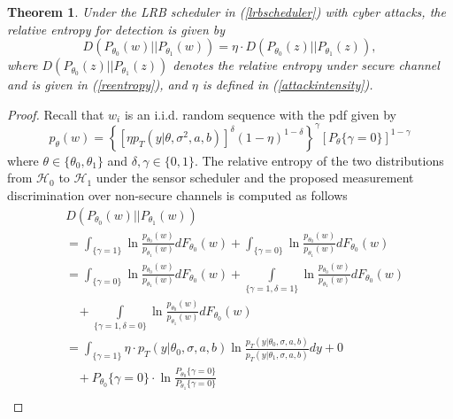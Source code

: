 \documentclass[journal]{IEEEtran}
\def\cH{\mathcal{H}}
\newtheorem{thm}{Theorem}
\begin{document}
\begin{thm}\label{thm_attack}
Under the LRB scheduler in (\ref{lrbscheduler}) with  cyber attacks, the relative entropy for detection is given by
\begin{equation}
D(P_{\theta_0}({w})||P_{\theta_1}({w}))=\eta \cdot D(P_{\theta_0}({z})||P_{\theta_1}({z})),
\end{equation}
where $D(P_{\theta_0}({z})||P_{\theta_1}({z}))$ denotes the relative entropy under secure channel and is given in (\ref{reentropy}), and $\eta$ is defined in (\ref{attackintensity}).
\end{thm}
\begin{proof}
Recall that $w_{i}$ is an i.i.d. random sequence with the pdf given by
\begin{equation*}
p_\theta(w) = {\left\{ {{{\left[ {\eta {p_T}(y|\theta ,{\sigma ^2},a,b)} \right]}^\delta }{{(1 - \eta )}^{1 - \delta }}} \right\}^\gamma }{\left[ {{P_\theta }\{ \gamma  = 0\} } \right]^{1 - \gamma }}
\end{equation*}
where $ \theta\in\{\theta_0, \theta_1\}$ and $\delta, \gamma\in\{0, 1\}$.
The relative entropy of the two distributions  from $\cH_0$ to $\cH_1$ under the sensor scheduler and  the proposed measurement discrimination over non-secure channels is computed as follows
\begin{equation*}
\begin{split}
&D(P_{\theta_0}({w})||P_{\theta_1}({w}))\\
&=\int_{\{ \gamma  = 1\} } {\ln \frac{{{p_{{\theta _0}}}(w)}}{{{p_{{\theta _1}}}(w)}}d{F_{{\theta _0}}}(w)}  + \int_{\{ \gamma  = 0\} } {\ln \frac{{{p_{{\theta _0}}}(w)}}{{{p_{{\theta _1}}}(w)}}d{F_{{\theta _0}}}(w)} \\
&=  \int_{\{ \gamma  = 0\} } {\ln \frac{{{p_{{\theta _0}}}(w)}}{{{p_{{\theta _1}}}(w)}}d{F_{{\theta _0}}}(w)} +
\int\limits_{\{ \gamma  = 1,\delta  = 1\} } {\ln \frac{{{p_{{\theta _0}}}(w)}}{{{p_{{\theta _1}}}(w)}}d{F_{{\theta _0}}}(w)}  \\
&~~~~+\int\limits_{\{ \gamma  = 1,\delta  = 0\} } {\ln \frac{{{p_{{\theta _0}}}(w)}}{{{p_{{\theta _1}}}(w)}}d{F_{{\theta _0}}}(w)} \\
&= \int_{\{ \gamma  = 1\} } {\eta  \cdot {p_T}(y|{\theta _0},\sigma ,a,b)\ln \frac{{{p_T}(y|{\theta _0},\sigma ,a,b)}}{{{p_T}(y|{\theta _1},\sigma ,a,b)}}dy}  + 0\\
&~~~~+ {P_{{\theta _0}}}\{ \gamma  = 0\}  \cdot \ln \frac{{{P_{{\theta _0}}}\{ \gamma  = 0\} }}{{{P_{{\theta _1}}}\{ \gamma  = 0\} }}\\

\end{split}
\end{equation*}
\end{proof}
\end{document}
